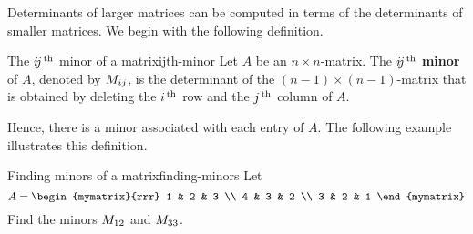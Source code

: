 Determinants of larger matrices can be computed in terms of the
determinants of smaller matrices. We begin with the following
definition.

\begin{definition}{The $\ijth$ minor of a matrix}{ijth-minor}
  Let $A$ be an $n\times n$-matrix. The $\ijth$ \textbf{minor}%
   of $A$, denoted by $\minor{A}{ij}$, is the
  determinant of the $(n-1)\times(n-1)$-matrix that is obtained by
  deleting the $i\th$ row and the $j\th$ column of $A$.
\end{definition}

Hence, there is a minor associated with each entry of $A$. The
following example illustrates this definition.

\begin{example}{Finding minors of a matrix}{finding-minors}
  Let
  \begin{equation*}
    A = \begin{mymatrix}{rrr}
      1 & 2 & 3 \\
      4 & 3 & 2 \\
      3 & 2 & 1
    \end{mymatrix}
  \end{equation*}
  Find the minors $\minor{A}{12}$ and $\minor{A}{33}$.
\end{example}

